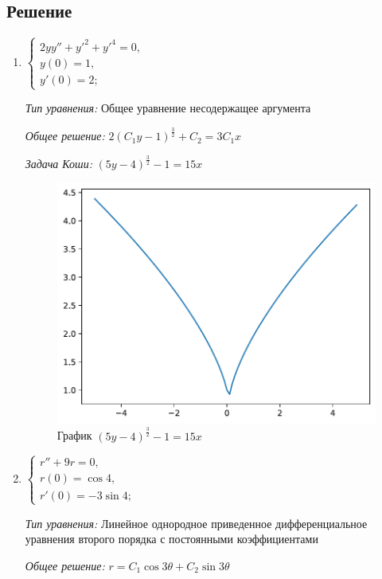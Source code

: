 \documentclass[a4paper, 14pt, fleqn]{extarticle}
\begin{document}
		\subsection{Решение}
			\begin{enumerate}
				\item \(\begin{cases}
						2yy'' + y'^2 + y'^4 = 0, \\
						y(0) = 1, \\
						y'(0) = 2;
					\end{cases}\)

					\textit{Тип уравнения:} Общее уравнение несодержащее аргумента				

					\textit{Общее решение:} \( 2 (C_1y-1)^{\frac{3}{2}} + C_2 = 3C_1x \)
	
					\textit{Задача Коши:} \( (5y-4)^{\frac{3}{2}} - 1 = 15x \)

					\begin{figure}[H]
					   	\centering
					    	\includegraphics[width = .75\linewidth]{1.pdf}
						\caption[.] {График \( (5y-4)^{\frac{3}{2}} - 1 = 15x \)}
  					\end{figure}
			
				\item \(\begin{cases}
						r'' + 9r = 0,\\
						r(0) = \cos{4}, \\
						r'(0) = -3\sin{4};
					\end{cases}\)
					
					\textit{Тип уравнения:} Линейное однородное приведенное дифференциальное уравнения второго порядка с постоянными коэффициентами

					\textit{Общее решение:} \( r = C_1\cos{3\theta} + C_2\sin{3\theta} \)
	

\end{enumerate}
\end{document}

